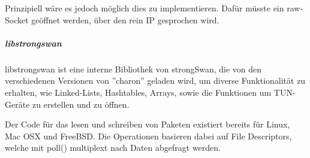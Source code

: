 Prinzipiell wäre es jedoch möglich dies zu implementieren. Dafür müsste ein
raw-Socket geöffnet werden, über den rein IP gesprochen wird.

\subparagraph{libstrongswan}
libstrongswan ist eine interne Bibliothek von strongSwan, die von den verschiedenen
Versionen von ''charon'' geladen wird, um diverse Funktionalität zu erhalten, wie
Linked-Lists, Hashtables, Arrays, sowie die Funktionen um TUN-Geräte zu erstellen und zu öffnen.

Der Code für das lesen und schreiben von Paketen existiert bereits für Linux, Mac OSX
und FreeBSD.
Die Operationen basieren dabei auf File Descriptors, welche mit poll() multiplext nach
Daten abgefragt werden.
